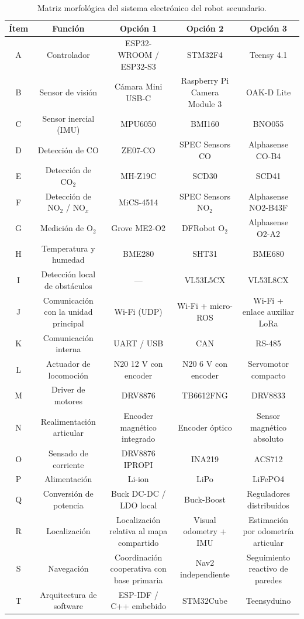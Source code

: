 \begin{table}[htbp]
\centering
\small
\renewcommand{\arraystretch}{1.3} %
\setlength{\tabcolsep}{4pt}       %

\begin{tabularx}{\textwidth}{|c|C|C|C|C|}
\hline
\textbf{Ítem} & \textbf{Función} & \textbf{Opción 1} & \textbf{Opción 2} & \textbf{Opción 3} \\
\hline
A & Controlador & ESP32-WROOM / ESP32-S3 & STM32F4 & Teensy 4.1 \\
\hline
B & Sensor de visión & Cámara Mini USB-C & Raspberry Pi Camera Module 3 & OAK-D Lite \\
\hline
C & Sensor inercial (IMU) & MPU6050 & BMI160 & BNO055 \\
\hline
D & Detección de $\text{CO}$ & ZE07-CO & SPEC Sensors CO & Alphasense CO-B4 \\
\hline
E & Detección de $\text{CO}_2$ & MH-Z19C & SCD30 & SCD41 \\
\hline
F & Detección de $\text{NO}_2$ / $\text{NO}_x$ & MiCS-4514 & SPEC Sensors $\text{NO}_2$ & Alphasense NO2-B43F \\
\hline
G & Medición de $\text{O}_2$ & Grove ME2-O2 & DFRobot $\text{O}_2$ & Alphasense O2-A2 \\
\hline
H & Temperatura y humedad & BME280 & SHT31 & BME680 \\
\hline
I & Detección local de obstáculos & --- & VL53L5CX & VL53L8CX \\
\hline
J & Comunicación con la unidad principal & Wi-Fi (UDP) & Wi-Fi + micro-ROS & Wi-Fi + enlace auxiliar LoRa \\
\hline
K & Comunicación interna & UART / USB & CAN & RS-485 \\
\hline
L & Actuador de locomoción & N20 12 V con encoder & N20 6 V con encoder & Servomotor compacto \\
\hline
M & Driver de motores & DRV8876 & TB6612FNG & DRV8833 \\
\hline
N & Realimentación articular & Encoder magnético integrado & Encoder óptico & Sensor magnético absoluto \\
\hline
O & Sensado de corriente & DRV8876 IPROPI & INA219 & ACS712 \\
\hline
P & Alimentación & Li-ion & LiPo & LiFePO4 \\
\hline
Q & Conversión de potencia & Buck DC-DC / LDO local & Buck-Boost & Reguladores distribuidos \\
\hline
R & Localización & Localización relativa al mapa compartido & Visual odometry + IMU & Estimación por odometría articular \\
\hline
S & Navegación & Coordinación cooperativa con base primaria & Nav2 independiente & Seguimiento reactivo de paredes \\
\hline
T & Arquitectura de software & ESP-IDF / C++ embebido & STM32Cube & Teensyduino \\
\hline
\end{tabularx}
\caption{Matriz morfológica del sistema electrónico del robot secundario.}
\label{tab:matriz_morfologica_secundario}
\end{table}

